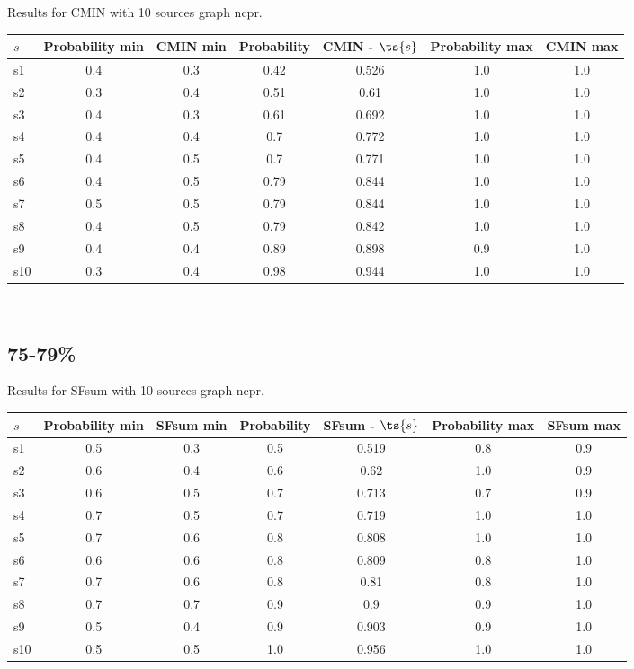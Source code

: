 \documentclass{article}
\begin{document}
\noindent Results for CMIN with 10 sources graph ncpr.

\noindent\begin{tabular}{|l|c|c|c|c|c|c|}
\hline
$s$& Probability min & CMIN min & Probability & CMIN - $\ts{s}$ & Probability max & CMIN max\\
\hline
s1 &0.4 & 0.3 & 0.42 & 0.526 & 1.0 & 1.0\\
\hline
s2 &0.3 & 0.4 & 0.51 & 0.61 & 1.0 & 1.0\\
\hline
s3 &0.4 & 0.3 & 0.61 & 0.692 & 1.0 & 1.0\\
\hline
s4 &0.4 & 0.4 & 0.7 & 0.772 & 1.0 & 1.0\\
\hline
s5 &0.4 & 0.5 & 0.7 & 0.771 & 1.0 & 1.0\\
\hline
s6 &0.4 & 0.5 & 0.79 & 0.844 & 1.0 & 1.0\\
\hline
s7 &0.5 & 0.5 & 0.79 & 0.844 & 1.0 & 1.0\\
\hline
s8 &0.4 & 0.5 & 0.79 & 0.842 & 1.0 & 1.0\\
\hline
s9 &0.4 & 0.4 & 0.89 & 0.898 & 0.9 & 1.0\\
\hline
s10 &0.3 & 0.4 & 0.98 & 0.944 & 1.0 & 1.0\\
\hline
\end{tabular}\\

\newpage

\subsection{75-79\%}

\noindent Results for SFsum with 10 sources graph ncpr.

\noindent\begin{tabular}{|l|c|c|c|c|c|c|}
\hline
$s$& Probability min & SFsum min & Probability & SFsum - $\ts{s}$ & Probability max & SFsum max\\
\hline
s1 &0.5 & 0.3 & 0.5 & 0.519 & 0.8 & 0.9\\
\hline
s2 &0.6 & 0.4 & 0.6 & 0.62 & 1.0 & 0.9\\
\hline
s3 &0.6 & 0.5 & 0.7 & 0.713 & 0.7 & 0.9\\
\hline
s4 &0.7 & 0.5 & 0.7 & 0.719 & 1.0 & 1.0\\
\hline
s5 &0.7 & 0.6 & 0.8 & 0.808 & 1.0 & 1.0\\
\hline
s6 &0.6 & 0.6 & 0.8 & 0.809 & 0.8 & 1.0\\
\hline
s7 &0.7 & 0.6 & 0.8 & 0.81 & 0.8 & 1.0\\
\hline
s8 &0.7 & 0.7 & 0.9 & 0.9 & 0.9 & 1.0\\
\hline
s9 &0.5 & 0.4 & 0.9 & 0.903 & 0.9 & 1.0\\
\hline
s10 &0.5 & 0.5 & 1.0 & 0.956 & 1.0 & 1.0\\
\hline
\end{tabular}\\
\end{document}
